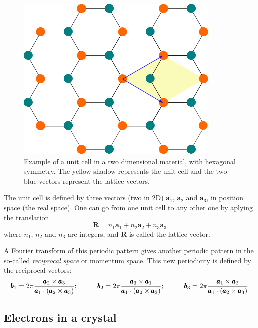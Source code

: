 \documentclass[a4paper,12pt]{report}
\begin{document}
\begin{figure}
 \centering
 \includegraphics[scale=0.5,keepaspectratio=true]{figures/unitcell_honeycomb.png}
 \caption{Example of a unit cell in a two dimensional material, with hexagonal symmetry.
 The yellow shadow represents the unit cell and the two blue vectors represent the lattice vectors.}
 \label{fig:unitcell}
\end{figure}

The unit cell is defined by three vectors (two in 2D) $\pmb{a}_1$, $\pmb{a}_2$ and $\pmb{a}_3$,
in position space (the real space).
One can go from one unit cell to any other one by aplying the translation
\begin{equation}
 \pmb{R} = n_1\pmb{a}_1 + n_2\pmb{a}_2 + n_3\pmb{a}_3
\end{equation}
where $n_1$, $n_2$ and $n_3$ are integers, and $\pmb{R}$ is called the lattice vector.

A Fourier transform of this periodic pattern gives another periodic pattern in the so-called
\emph{reciprocal space} or momentum space.
This new periodicity is defined by the reciprocal vectors:
\begin{equation*}
 \pmb{b}_1 = 2\pi\dfrac{\pmb{a}_2\times\pmb{a}_3}{\pmb{a}_1\cdot (\pmb{a}_2\times\pmb{a}_3)};\hspace*{1cm}
 \pmb{b}_2 = 2\pi\dfrac{\pmb{a}_3\times\pmb{a}_1}{\pmb{a}_1\cdot (\pmb{a}_2\times\pmb{a}_3)};\hspace*{1cm}
 \pmb{b}_3 = 2\pi\dfrac{\pmb{a}_1\times\pmb{a}_2}{\pmb{a}_1\cdot (\pmb{a}_2\times\pmb{a}_3)}
\end{equation*}

\subsection*{Electrons in a crystal}
\end{document}

